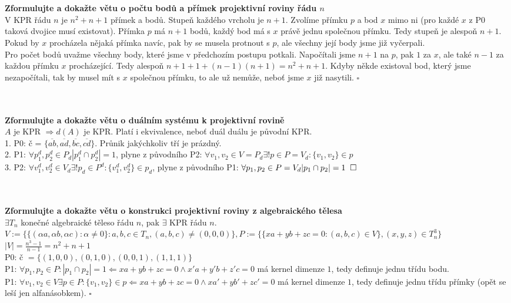 \documentclass[a4paper]{article}
\newcommand{\qed}{\hspace{0.2cm}\square}
\newcommand{\led}{\hspace{0.2cm}$\square$}
\newcommand{\hlava}[1]{\text{} \\ \text{} \\ \text{} \hspace{-0.27cm} \textbf{#1} \\}
\begin{document}
\hlava{Zformulujte a dokažte větu o počtu bodů a přímek projektivní roviny řádu $n$}
V KPR řádu $n$ je $n^2 +n +1$ přímek a bodů. Stupeň každého vrcholu je $n+1$.
Zvolíme přímku $p$ a bod $x$ mimo ni (pro každé $x$ z P0 taková dvojice musí existovat). Přímka $p$ má $n+1$ bodů, každý bod má s $x$ právě jednu společnou přímku. Tedy stupeň je alespoň $n+1$. Pokud by $x$ procházela nějaká přímka navíc, pak by se musela protnout s $p$, ale všechny její body jsme již vyčerpali. \\
Pro počet bodů uvažme všechny body, které jsme v předchozím postupu potkali. Napočítali jsme $n+1$ na $p$, pak $1$ za $x$, ale také $n-1$ za každou přímku $x$ procházející. Tedy alespoň $n+1 +1 + (n-1)(n+1) = n^2+n+1$. Kdyby někde existoval bod, který jsme nezapočítali, tak by musel mít s $x$ společnou přímku, to ale už nemůže, neboť jsme $x$ již nasytili. \led

\hlava{Zformulujte a dokažte větu o duálním systému k projektivní rovině}
$A$ je KPR $\Rightarrow d(A)$ je KPR. Platí i ekvivalence, neboť duál duálu je původní KPR. \\
1. P0: č = $\{\overline{ab},\overline{ad},\overline{bc},\overline{cd} \}$. Průnik jakýchkoliv tří je prázdný. \\
2. P1: $\forall p_1^d, p_2^d \in P_d |p_1^d \cap p_2^d| = 1$, plyne z původního P2: $\forall v_1, v_2 \in V=P_d \exists! p \in P = V_d : \{v_1, v_2\} \in p$ \\
3. P2: $\forall v^d_1, v^d_2 \in V_d \exists! p_d \in P^d : \{v_1^d, v_2^d\} \in p_d$, plyne z původního P1: $\forall p_1, p_2 \in P = V_d |p_1 \cap p_2| = 1 \qed$ 

\hlava{Zformulujte a dokažte větu o konstrukci projektivní roviny z algebraického tělesa}
$\exists T_n$ konečné algebraické těleso řádu $n$, pak $\exists $ KPR řádu $n$. \\
$ V :=\{ \{(\alpha a, \alpha b, \alpha c ): \alpha \ne 0 \} : a,b,c \in T_n, (a,b,c) \ne (0,0,0) \}, P := \{ \{ xa+yb+zc=0: (a, b, c) \in V\}, (x, y, z) \in T_n^3\} $ \\
$ |V| = \frac{n^3-1 }{n-1} = n^2 + n + 1$ \\
P0: č $= \{ (1, 0, 0), (0, 1, 0), (0, 0, 1), (1, 1, 1)\}$ \\
P1: $\forall p_1, p_2 \in P: |p_1 \cap p_2| = 1 \Leftarrow xa+ yb +zc = 0 \wedge x'a + y'b + z'c = 0 $ má kernel dimenze $1$, tedy definuje jednu třídu bodu. \\
P1: $\forall v_1, v_2 \in V \exists p \in P: \{v_1, v_2\} \in p \Leftarrow xa+ yb +zc = 0 \wedge xa' + yb' + zc' = 0 $ má kernel dimenze $1$, tedy definuje jednu třídu přímky (opět se leší jen alfanásobkem). \led
\end{document}
